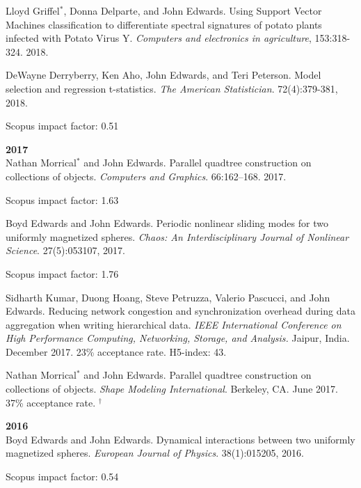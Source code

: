 \documentclass[margin,line]{res}
\newcommand{\pubunder}[1]{#1}
\begin{document}
\begin{resume}
Lloyd Griffel$^*$, Donna Delparte, and John Edwards. Using Support Vector Machines classification to differentiate spectral signatures of potato plants infected with Potato Virus Y. \textit{Computers and electronics in agriculture}, 153:318-324. 2018.

DeWayne Derryberry, Ken Aho, \pubunder{John Edwards}, and Teri Peterson. Model selection and regression t-statistics. \textit{The American Statistician}. 72(4):379-381, 2018.
\begin{IMPACT}
Scopus impact factor: 0.51 %
\end{IMPACT}

\textbf{2017} \\
Nathan Morrical$^*$ and \pubunder{John Edwards}. Parallel quadtree construction on collections of objects. \textit{Computers and Graphics}. 66:162–168. 2017.
\begin{IMPACT}
Scopus impact factor: 1.63 %
\end{IMPACT}

Boyd Edwards and \pubunder{John Edwards}. Periodic nonlinear sliding modes for two uniformly magnetized spheres. \textit{Chaos: An Interdisciplinary Journal of Nonlinear Science}. 27(5):053107, 2017.
\begin{IMPACT}
Scopus impact factor: 1.76 %
\end{IMPACT}

Sidharth Kumar, Duong Hoang, Steve Petruzza, Valerio Pascucci, and \pubunder{John Edwards}. Reducing network congestion and synchronization overhead during data aggregation when writing hierarchical data. \textit{IEEE International Conference on High Performance Computing, Networking, Storage, and Analysis.} Jaipur, India. December 2017. 23\% acceptance rate. H5-index: 43.

Nathan Morrical$^*$ and \pubunder{John Edwards}. Parallel quadtree construction on collections of objects. \textit{Shape Modeling International}. Berkeley, CA. June 2017. 37\% acceptance rate.
$^\dagger$

\textbf{2016} \\
Boyd Edwards and \pubunder{John Edwards}. Dynamical interactions between two uniformly magnetized spheres. \textit{European Journal of Physics}. 38(1):015205, 2016.
\begin{IMPACT}
Scopus impact factor: 0.54 %
\end{IMPACT}


\end{resume}
\end{document}
